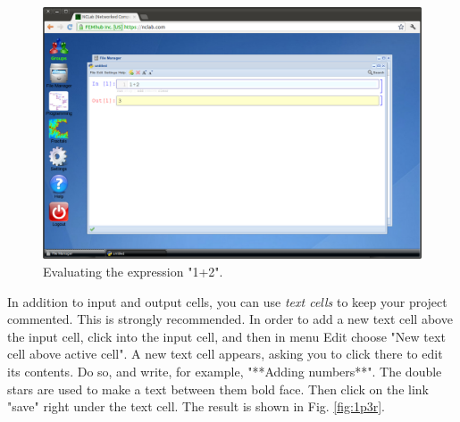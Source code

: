 \documentclass[article,A4,12pt]{llncs}
\begin{document}
\begin{figure}[!ht]
\begin{center}
\includegraphics[width=\textwidth]{img/1p3.png}
\end{center}
\caption{Evaluating the expression "1+2".}
\label{fig:1p3}
\end{figure}
\noindent
\noindent
In addition to input and output cells, you can use {\em text cells}
to keep your project commented. This is strongly recommended. In
order to add a new text cell above the input cell, click into
the input cell, and then in menu Edit choose "New text cell above
active cell". A new text cell appears, asking you to click there to
edit its contents. Do so, and write, for example, "**Adding numbers**".
The double stars are used to make a text between them bold face. 
Then click on the link "save" right under the text cell. The result 
is shown in Fig. \ref{fig:1p3r}.
\end{document}
